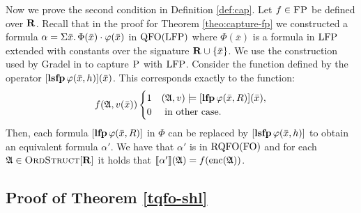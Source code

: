 \vspace{1em}
Now we prove the second condition in Definition \ref{def:cap}. Let $f\in\text{\sc FP}$ be defined over $\mathbf{R}$. Recall that in the proof for Theorem \ref{theo:capture-fp} we constructed a formula $\alpha = \Sigma{\bar{x}}.\,\Phi(\bar{x})\cdot\varphi(\bar{x})$ in ${\rm QFO}({\rm LFP})$ where $\Phi(\bar{x})$ is a formula in ${\rm LFP}$ extended with constants over the signature $\mathbf{R} \cup \{\bar{x}\}$. We use the construction used by Gradel in \cite{G07} to capture $\text{\sc P}$ with ${\rm LFP}$. Consider the function defined by the operator $[{\bf lsfp} \, \varphi(\bar{x},h)](\bar{x})$. This corresponds exactly to the function:
$$
f(\mathfrak{A},v(\bar{x})) 
\begin{cases}
1 &(\mathfrak{A},v)\models [{\bf lfp}\,{\varphi(\bar{x},R)}](\bar{x}), \\
0 &\text{ in other case.}
\end{cases}
$$
Then, each formula $[{\bf lfp}\,{\varphi(\bar{x},R)}]$ in $\Phi$ can be replaced by $[{\bf lsfp} \, \varphi(\bar{x},h)]$ to obtain an equivalent formula $\alpha'$. We have that $\alpha'$ is in ${\rm RQFO}({\rm FO})$ and for each $\mathfrak{A}\in\text{\sc OrdStruct}[\mathbf{R}]$ it holds that ${\llbracket{}{\alpha'}\rrbracket}(\mathfrak{A}) = f({\rm enc}(\mathfrak{A}))$.


\subsection*{Proof of Theorem \ref{tqfo-shl}}


